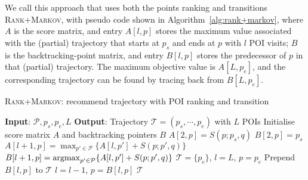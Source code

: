 We call this approach that uses both the points ranking and transitions \textsc{Rank+Markov},
with pseudo code shown in Algorithm~\ref{alg:rank+markov},
where $A$ is the score matrix, and entry $A[l, p]$ stores the maximum value associated with the (partial) trajectory
that starts at $p_s$ and ends at $p$ with $l$ POI visits;
$B$ is the backtracking-point matrix, and entry $B[l, p]$ stores the predecessor of $p$ in that (partial) trajectory.
The maximum objective value is $A[L, p_e]$,
and the corresponding trajectory can be found by tracing back from $B[L, p_e]$.

\setlength{\textfloatsep}{0.5em} %

\begin{algorithm}[t]
\caption{\textsc{Rank+Markov}: recommend trajectory with POI ranking and transition}
\label{alg:rank+markov}
\begin{algorithmic}[1]
\STATE \textbf{Input}: $\mathcal{P}, p_s, p_e, L$
\STATE \textbf{Output}: Trajectory $\mathcal{T} = (p_s, \cdots, p_e)$ with $L$ POIs
\STATE Initialise score matrix $A$ and backtracking pointers $B$
    \STATE $A[2, p] = S(p; p_s, q)$
    \STATE $B[2, p] = p_s$
\ENDFOR
{}
        \STATE $A[l+1, p]   = \max_{p' \in \mathcal{P}} \{ A[l, p'] + S(p; p', q) \}$ \label{eq:max}
        \STATE $B[l+1, p]   = \operatorname*{argmax}_{p' \in \mathcal{P}} \{ A[l, p'] + S(p; p', q) \}$ \label{eq:argmax}
    \ENDFOR
\ENDFOR
\STATE $\mathcal{T}= \{p_e\}$, $l = L$, $p = p_e$
\REPEAT
    \STATE Prepend $B[l, p]$ to $\mathcal{T}$
    \STATE $l = l - 1$, $p = B[l, p]$
\RETURN $\mathcal{T}$
\end{algorithmic}
\end{algorithm}


